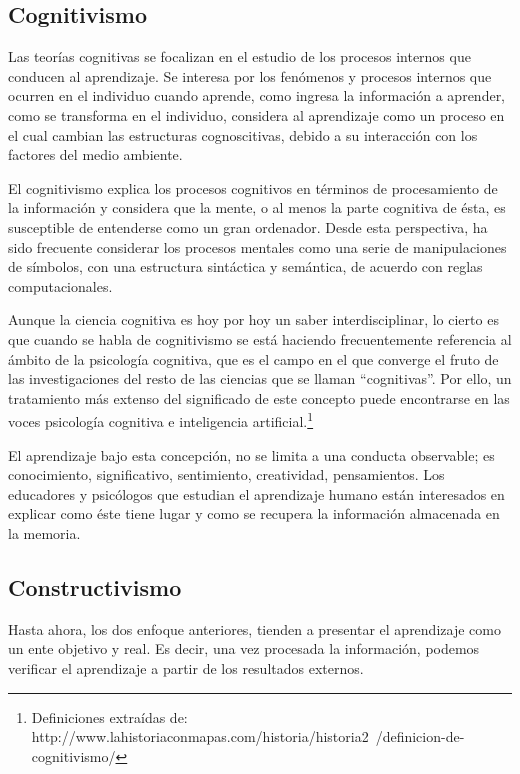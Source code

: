 \subsection{Cognitivismo}

Las teorías cognitivas se focalizan en el estudio de los procesos internos que
conducen al aprendizaje. Se interesa por los fenómenos y procesos internos que
ocurren en el individuo cuando aprende, como ingresa la información a aprender,
como se transforma en el individuo, considera al aprendizaje como un proceso en
el cual cambian las estructuras cognoscitivas, debido a su interacción con los
factores del medio ambiente.

El cognitivismo explica los procesos cognitivos en términos de procesamiento de
la información y considera que la mente, o al menos la parte cognitiva de ésta,
es susceptible de entenderse como un gran ordenador. Desde esta perspectiva, ha
sido frecuente considerar los procesos mentales como una serie de manipulaciones
de símbolos, con una estructura sintáctica y semántica, de acuerdo con reglas
computacionales.

Aunque la ciencia cognitiva es hoy por hoy un saber interdisciplinar, lo cierto
es que cuando se habla de cognitivismo se está haciendo frecuentemente
referencia al ámbito de la psicología cognitiva, que es el campo en el que
converge el fruto de las investigaciones del resto de las ciencias que se llaman
“cognitivas”. Por ello, un tratamiento más extenso del significado de este
concepto puede encontrarse en las voces psicología cognitiva e inteligencia
artificial.\footnote{Definiciones extraídas de:
http://www.lahistoriaconmapas.com/historia/historia2\
/definicion-de-cognitivismo/}

El aprendizaje bajo esta concepción, no se limita a una conducta observable; es
conocimiento, significativo, sentimiento, creatividad, pensamientos. Los
educadores y psicólogos que estudian el aprendizaje humano están interesados en
explicar como éste tiene lugar y como se recupera la información almacenada en
la memoria.\cite{Rojas}

\subsection{Constructivismo}

Hasta ahora, los dos enfoque anteriores, tienden a presentar el aprendizaje como
un ente objetivo y real. Es decir, una vez procesada la información, podemos
verificar el aprendizaje a partir de los resultados externos.

